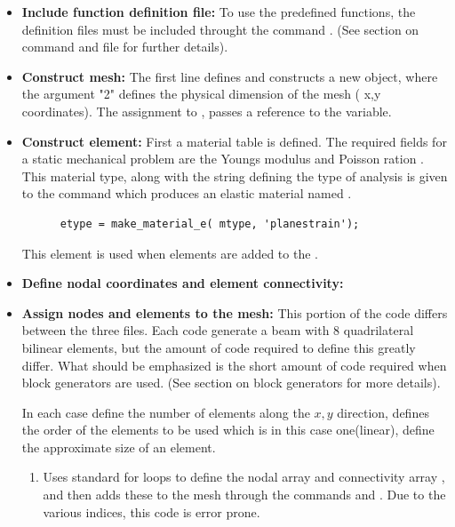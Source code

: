 \begin{itemize}

  \item{\textbf{Include function definition file:}}
  To use the predefined functions, the definition files
  must be included throught the command .
  (See section on  command and file 
  for further details).

  \item{\textbf{Construct mesh:}}
  The first line defines and constructs 
  a new  object, where the
  argument "2" defines the physical dimension of
  the mesh ( x,y coordinates). The assignment to 
  , passes a reference to the variable.

  \item{\textbf{Construct element:}}
  First a material table  is defined. The
  required fields for a static mechanical problem are 
  the Youngs modulus  and Poisson ration .
  This material type, along with the string defining the 
  type of analysis is given to the command 
  which produces an elastic material named .
  \begin{verbatim}
      etype = make_material_e( mtype, 'planestrain');
  \end{verbatim}
  This element is used when elements are added to the .

  \item{\textbf{Define nodal coordinates and element connectivity:}}
  \item{\textbf{Assign nodes and elements to the mesh:}}
  This portion of the code differs between the three files.
  Each code generate a beam with 8 quadrilateral bilinear 
  elements, but the amount of code required to define this
  greatly differ. What should be emphasized is the short
  amount of code required when block generators are used.
  (See section on block generators for more details).

  In each case  define the number of 
  elements along the $x,y$ direction,  defines the
  order of the elements to be used which is in this case one(linear),
   define the approximate size of an 
  element. 
  \begin{enumerate}

    \item{}
    Uses standard for loops to define the nodal array  and
    connectivity array , and then adds these to the 
    mesh through the commands  and .
    Due to the various indices, this code is error prone. 


\end{enumerate}
\end{itemize}
